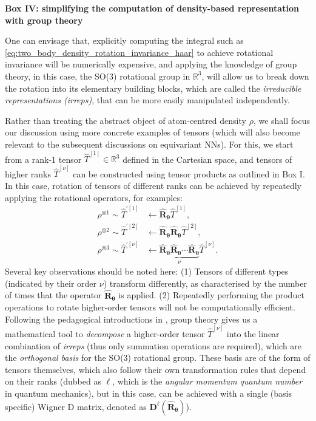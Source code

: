\begin{myquote}
    \textbf{Box IV: simplifying the computation of density-based representation with group theory}

\footnotesize
\hspace{10pt} One can envisage that, explicitly computing the integral such as \cref{eq:two_body_density_rotation_invariance_haar} to achieve rotational invariance will be numerically expensive, and applying the knowledge of group theory, in this case, the SO(3) rotational group in $\mathbb{R}^3$, will allow us to break down the rotation into its elementary building blocks, which are called the \emph{irreducible representations (irreps)}, that can be more easily manipulated independently. 

\hspace{10pt} Rather than treating the abstract object of atom-centred density $\rho$, we shall focus our discussion using more concrete examples of tensors (which will also become relevant to the subsequent discussions on equivariant NNs). For this, we start from a rank-1 tensor $\hat{T}^{[1]}\in\mathbb{R}^{3}$ defined in the Cartesian space, and tensors of higher ranks $\hat{T}^{[\nu]}$ can be constructed using tensor products as outlined in Box I. In this case, rotation of tensors of different ranks can be achieved by repeatedly applying the rotational operators, for examples:
\begin{align*}
    \rho^{\otimes 1}\sim\hat{T}^{\prime [1]}&\leftarrow \hat{\bm{R}}_{\boldsymbol{\theta}}\hat{T}^{[1]},\\
    \rho^{\otimes 2}\sim\hat{T}^{\prime [2]}&\leftarrow 
    \hat{\bm{R}}_{\boldsymbol{\theta}}\hat{\bm{R}}_{\boldsymbol{\theta}}\hat{T}^{[2]}, \\
    \rho^{\otimes 3}\sim\hat{T}^{\prime [\nu]}&\leftarrow \underbrace{\hat{\bm{R}}_{\boldsymbol{\theta}}\hat{\bm{R}}_{\boldsymbol{\theta}}\cdots\hat{\bm{R}}_{\boldsymbol{\theta}}}_{\nu}\hat{T}^{[\nu]}.
\end{align*}
Several key observations should be noted here: (1) Tensors of different types (indicated by their order $\nu$) transform differently, as characterised by the number of times that the operator $\hat{\bm{R}}_{\boldsymbol{\theta}}$ is applied. (2) Repeatedly performing the product operations to rotate higher-order tensors will not be computationally efficient. Following the pedagogical introductions in \citet{duval2023hitchhiker}, group theory gives us a mathematical tool to \emph{decompose} a higher-order tensor $\hat{T}^{[\nu]}$ into the linear combination of \emph{irreps} (thus only summation operations are required), which are the \emph{orthogonal basis} for the SO(3) rotational group. These basis are of the form of tensors themselves, which also follow their own transformation rules that depend on their ranks (dubbed as $\ell$, which is the \textit{angular momentum quantum number} in quantum mechanics), but in this case, can be achieved with a single (basis specific) Wigner D matrix, denoted as $\mathbf{D}^{\ell}(\hat{\bm{R}}_{\boldsymbol{\theta}})$).


\end{myquote}
